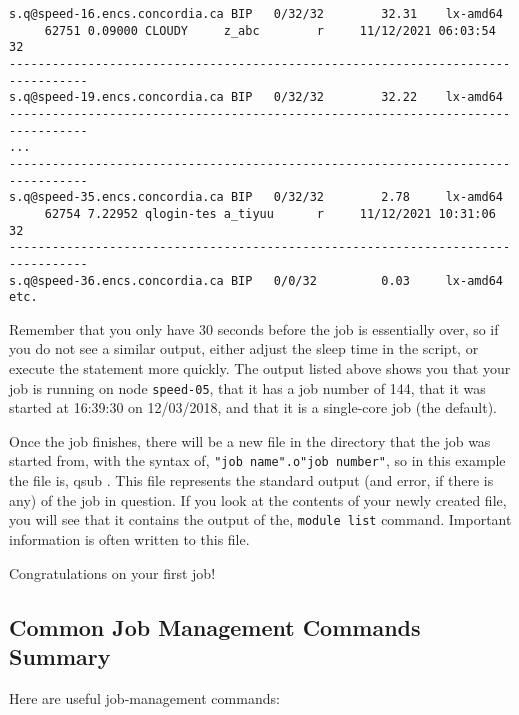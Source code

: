 \documentclass{easychair}
\begin{document}
\begin{verbatim}
s.q@speed-16.encs.concordia.ca BIP   0/32/32        32.31    lx-amd64
     62751 0.09000 CLOUDY     z_abc        r     11/12/2021 06:03:54    32
---------------------------------------------------------------------------------
s.q@speed-19.encs.concordia.ca BIP   0/32/32        32.22    lx-amd64
---------------------------------------------------------------------------------
...
---------------------------------------------------------------------------------
s.q@speed-35.encs.concordia.ca BIP   0/32/32        2.78     lx-amd64
     62754 7.22952 qlogin-tes a_tiyuu      r     11/12/2021 10:31:06    32
---------------------------------------------------------------------------------
s.q@speed-36.encs.concordia.ca BIP   0/0/32         0.03     lx-amd64
etc.
\end{verbatim}
\normalsize

Remember that you only have 30 seconds before the job is essentially over, so 
if you do not see a similar output, either adjust the sleep time in the 
script, or execute the  statement more quickly. The  
output listed above shows you that your job is 
running on node \texttt{speed-05}, that it has a job number of 144, that it 
was started at 16:39:30 on 12/03/2018, and that it is a single-core job (the 
default). 

Once the job finishes, there will be a new file in the directory that the job 
was started from, with the syntax of, \texttt{"job name".o"job number"}, so 
in this example the file is, qsub . This file represents the 
standard output (and error, if there is any) of the job in question. If you 
look at the contents of your newly created file, you will see that it 
contains the output of the, \texttt{module list} command. 
Important information is often written to this file.

Congratulations on your first job! 

\subsection{Common Job Management Commands Summary}
\label{sect:job-management-commands}

Here are useful job-management commands: 
\end{document}
